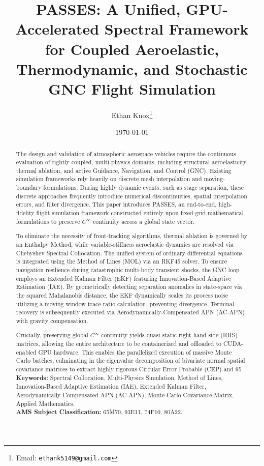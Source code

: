 \documentclass[11pt,a4paper]{article}
\title{PASSES: A Unified, GPU-Accelerated Spectral Framework for Coupled Aeroelastic, Thermodynamic, and Stochastic GNC Flight Simulation}
\author[1]{Ethan Knox\thanks{Email: \texttt{ethank5149@gmail.com}}}
\affil[1]{Independent Researcher, Champaign, IL, USA}
\date{\today}
\theoremstyle{definition}
\numberwithin{equation}{section}
\begin{document}
\maketitle

\begin{abstract}
    The design and validation of atmospheric aerospace vehicles require the continuous evaluation of tightly coupled, multi-physics domains, including structural aeroelasticity, thermal ablation, and active Guidance, Navigation, and Control (GNC). Existing simulation frameworks rely heavily on discrete mesh interpolation and moving-boundary formulations. During highly dynamic events, such as stage separation, these discrete approaches frequently introduce numerical discontinuities, spatial interpolation errors, and filter divergence. This paper introduces PASSES, an end-to-end, high-fidelity flight simulation framework constructed entirely upon fixed-grid mathematical formulations to preserve $C^\infty$ continuity across a global state vector.
    
    To eliminate the necessity of front-tracking algorithms, thermal ablation is governed by an Enthalpy Method, while variable-stiffness aeroelastic dynamics are resolved via Chebyshev Spectral Collocation. The unified system of ordinary differential equations is integrated using the Method of Lines (MOL) via an RKF45 solver. To ensure navigation resilience during catastrophic multi-body transient shocks, the GNC loop employs an Extended Kalman Filter (EKF) featuring Innovation-Based Adaptive Estimation (IAE). By geometrically detecting separation anomalies in state-space via the squared Mahalanobis distance, the EKF dynamically scales its process noise utilizing a moving-window trace-ratio calculation, preventing divergence. Terminal recovery is subsequently executed via Aerodynamically-Compensated APN (AC-APN) with gravity compensation.
    
    Crucially, preserving global $C^\infty$ continuity yields quasi-static right-hand side (RHS) matrices, allowing the entire architecture to be containerized and offloaded to CUDA-enabled GPU hardware. This enables the parallelized execution of massive Monte Carlo batches, culminating in the eigenvalue decomposition of bivariate normal spatial covariance matrices to extract highly rigorous Circular Error Probable (CEP) and 95%
    \\[2ex]
    \textbf{Keywords:} Spectral Collocation, Multi-Physics Simulation, Method of Lines, Innovation-Based Adaptive Estimation (IAE), Extended Kalman Filter, Aerodynamically-Compensated APN (AC-APN), Monte Carlo Covariance Matrix, Applied Mathematics.
    \\[1ex]
    \textbf{AMS Subject Classification:} 65M70, 93E11, 74F10, 80A22.
\end{abstract}
\end{document}
